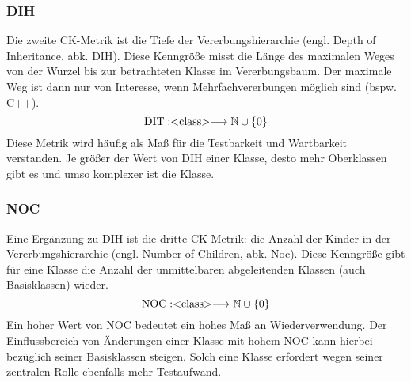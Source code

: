 \documentclass[12pt]{article}
\newcommand{\type}[1]{<\negthickspace\text{#1}\negthickspace> }
\begin{document}


\subsubsection{DIH}

Die zweite CK-Metrik ist die Tiefe der Vererbungshierarchie
(engl. Depth of Inheritance, abk. DIH). Diese Kenngröße misst die
Länge des maximalen Weges von der Wurzel bis zur betrachteten
Klasse im Vererbungsbaum. Der maximale Weg ist dann nur von
Interesse, wenn Mehrfachvererbungen möglich sind (bspw. C++).
\[
        \text{DIT}: \type{class} 
        \longrightarrow \mathbb{N} \cup \left\{ 0 \right\} 
\]
Diese Metrik wird häufig als Maß für die Testbarkeit und
Wartbarkeit verstanden. Je größer der Wert von DIH einer Klasse,
desto mehr Oberklassen gibt es und umso komplexer ist die Klasse.


\subsubsection{NOC}

Eine Ergänzung zu DIH ist die dritte CK-Metrik: die Anzahl der
Kinder in der Vererbungshierarchie (engl. Number of Children, abk.
Noc). Diese Kenngröße gibt für eine Klasse die Anzahl der
unmittelbaren abgeleitenden Klassen (auch Basisklassen) wieder.
\[
        \text{NOC}: \type{class} 
        \longrightarrow \mathbb{N} \cup \left\{ 0 \right\} 
\]
Ein hoher Wert von NOC bedeutet ein hohes Maß an
Wiederverwendung. Der Einflussbereich von Änderungen einer Klasse
mit hohem NOC kann hierbei bezüglich seiner Basisklassen steigen.
Solch eine Klasse erfordert wegen seiner zentralen Rolle
ebenfalls mehr Testaufwand.
\end{document}
